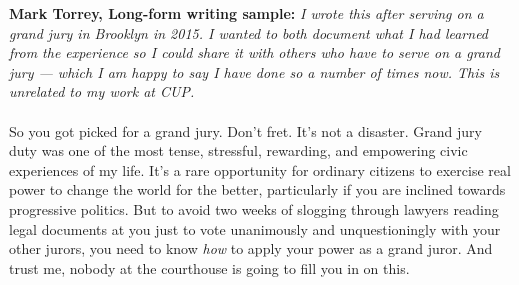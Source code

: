 \documentclass[letterpaper]{article}
\begin{document}
\textbf{Mark Torrey, Long-form writing sample:}
\textit{I wrote this after serving on a grand jury in Brooklyn in 2015. I wanted to both document what I had learned from the experience so I could share it with others who have to serve on a grand jury --- which I am happy to say I have done so a number of times now. This is unrelated to my work at CUP.}\\
\\




So you got picked for a grand jury.
Don't fret. It's not a disaster.
Grand jury duty was one of the most tense, stressful, rewarding, and empowering civic experiences of my life.
It's a rare opportunity for ordinary citizens to exercise real power to change the world for the better, particularly if you are inclined towards progressive politics.
But to avoid two weeks of slogging through lawyers reading legal documents at you just to vote unanimously and unquestioningly with your other jurors, you need to know \emph{how} to apply your power as a grand juror.
And trust me, nobody at the courthouse is going to fill you in on this.
\end{document}
